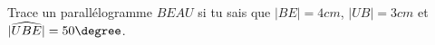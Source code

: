%
%
	Trace un parallélogramme $BEAU$ si tu sais que $|BE|=4cm$, $|UB|=3cm$ et $|\widehat{UBE}|=50\degree $.
	\vspace{5cm}
